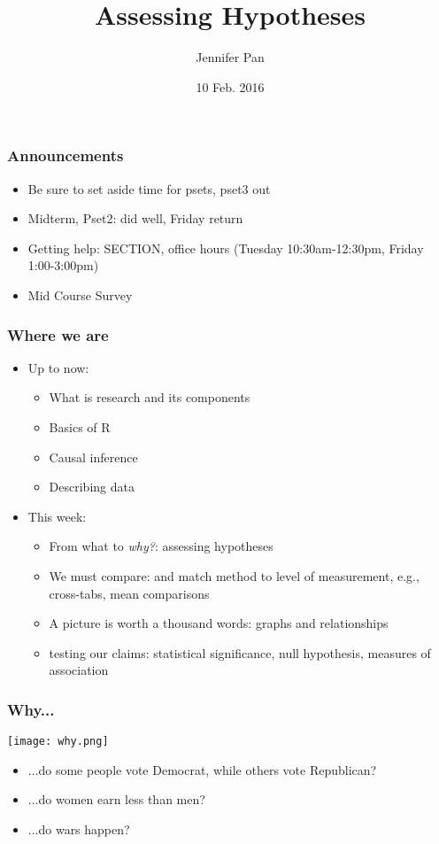 \documentclass{beamer}
\title[COMM 106/206]{Assessing Hypotheses}
\subtitle{\black{Communication Research Methods}} %
\author[Jennifer Pan]{Jennifer Pan}
\institute[Stanford]{Assistant Professor\\
  Department of Communication\\
  Stanford University
  \mbox{ }\\
  \mbox{ }\\
  \mbox{ }\\
  \mbox{ }\\
  \mbox{ }\\
  \mbox{ }\\
  \mbox{ }\\
  \mbox{ }\\
  \mbox{ }\\
  {February 10, 2016}}
\date{}
\begin{document}
\frame{\titlepage}
\date{10 Feb. 2016}

\begin{frame}
 \frametitle<+->{Announcements}
 \begin{itemize}[<+->]
   \item Be sure to set aside time for psets, pset3 out
   \item Midterm, Pset2: did well, Friday return
   \item Getting help: SECTION, office hours (Tuesday 10:30am-12:30pm, Friday 1:00-3:00pm)
   \item Mid Course Survey
 \end{itemize}
\end{frame}

\begin{frame}
 \frametitle<+->{Where we are}
 \begin{itemize}[<+->]
   \item Up to now:
     \begin{itemize}
       \item What is research and its components
       \item Basics of R
       \item Causal inference
       \item Describing data
     \end{itemize}
   \item This week:
     \begin{itemize}
       \item From what to \textit{why?}: assessing \alert{hypotheses}
       \item We must compare: and match method to level of measurement, e.g., cross-tabs, mean comparisons
       \item A picture is worth a thousand words: graphs and relationships
       \item testing our claims:  statistical significance, null hypothesis, measures of association
     \end{itemize}
 \end{itemize}
\end{frame}

\begin{frame}
 \frametitle<+->{Why...}
 \begin{minipage}{.48\linewidth}
 \texttt{[image: why.png]}
 \end{minipage}\hfill
 \begin{minipage}{.48\linewidth}
 \begin{itemize}[<+->]
   \item ...do some people vote Democrat, while others vote Republican?
   \item ...do women earn less than men?
   \item ...do wars happen?
 \end{itemize}
 \end{minipage}
\end{frame}
\end{document}
